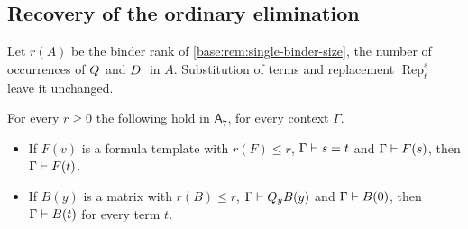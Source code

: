 \subsection{Recovery of the ordinary elimination}
\label{kern:sec:aqerank}

Let $r(A)$ be the binder rank of \cref{base:rem:single-binder-size}, the
number of occurrences of $Q_{}$ and $D_{,}$ in $A$.  Substitution of terms
and replacement $\operatorname{Rep}_{t}^{s}$ leave it unchanged.

\begin{lemma}
\label{kern:lem:aqerank}
For every $r\ge 0$ the following hold in $\mathsf{A}_7$, for every context
$\Gamma$.
\begin{itemize}
\item[$(\mathrm L_r)$] If $F(v)$ is a formula template with $r(F)\le r$,
 $\Gamma\vdash s=t$ and $\Gamma\vdash F(s)$, then $\Gamma\vdash F(t)$.
\item[$(\mathrm E_r)$] If $B(y)$ is a matrix with $r(B)\le r$,
 $\Gamma\vdash Q_{y}B(y)$ and $\Gamma\vdash B(0)$, then
 $\Gamma\vdash B(t)$ for every term $t$.
\end{itemize}
\end{lemma}

